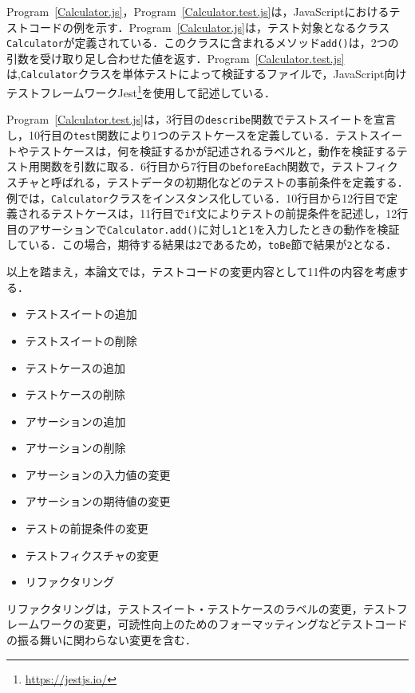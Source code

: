\documentclass[11pt,dvipdfmx]{jreport}
\begin{document}
Program~\ref{Calculator.js}，Program~\ref{Calculator.test.js}は，JavaScriptにおけるテストコードの例を示す．Program~\ref{Calculator.js}は，テスト対象となるクラス{\verb|Calculator|}が定義されている．このクラスに含まれるメソッド{\verb|add()|}は，2つの引数を受け取り足し合わせた値を返す．Program~\ref{Calculator.test.js}は,{\verb|Calculator|}クラスを単体テストによって検証するファイルで，JavaScript向けテストフレームワークJest\footnote{\url{https://jestjs.io/}}を使用して記述している．

Program~\ref{Calculator.test.js}は，3行目の{\verb|describe|}関数でテストスイートを宣言し，10行目の{\verb|test|}関数により1つのテストケースを定義している．テストスイートやテストケースは，何を検証するかが記述されるラベルと，動作を検証するテスト用関数を引数に取る．6行目から7行目の{\verb|beforeEach|}関数で，テストフィクスチャと呼ばれる，テストデータの初期化などのテストの事前条件を定義する．例では，{\verb|Calculator|}クラスをインスタンス化している．10行目から12行目で定義されるテストケースは，11行目で{\verb|if|}文によりテストの前提条件を記述し，12行目のアサーションで{\verb|Calculator.add()|}に対し{\verb|1|}と{\verb|1|}を入力したときの動作を検証している．この場合，期待する結果は{\verb|2|}であるため，{\verb|toBe|}節で結果が{\verb|2|}となる．

以上を踏まえ，本論文では，テストコードの変更内容として11件の内容を考慮する．

\begin{itemize}
  \setlength{\itemsep}{0cm}
  \item テストスイートの追加
  \item テストスイートの削除
  \item テストケースの追加
  \item テストケースの削除
  \item アサーションの追加
  \item アサーションの削除
  \item アサーションの入力値の変更
  \item アサーションの期待値の変更
  \item テストの前提条件の変更
  \item テストフィクスチャの変更
  \item リファクタリング
\end{itemize}

リファクタリングは，テストスイート・テストケースのラベルの変更，テストフレームワークの変更，可読性向上のためのフォーマッティングなどテストコードの振る舞いに関わらない変更を含む．
\end{document}
